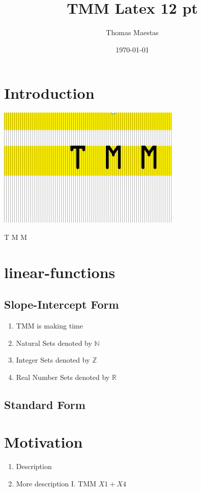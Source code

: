 \documentclass[12pt,letterpaper]{article}
\begin{document}
\date{\today}
\title{TMM Latex 12 pt}
\author{Thomas Maestas}
\maketitle
\section{Introduction} 
\begin{center}
\includegraphics[scale=0.5]{assets/TMM.jpg}
\end{center}
\begin{huge}T M M 
\end{huge}
\section{linear-functions}
\subsection{Slope-Intercept Form}
\begin{enumerate}
\item TMM is making time
\item Natural Sets denoted by $\mathbb{N}$
\item Integer Sets denoted by $\mathbb{Z}$
\item Real Number Sets denoted by $\mathbb{R}$
\end{enumerate}
\subsection{Standard Form}
\section{Motivation}
\begin{enumerate}
\item Description
\item More description
I. TMM $X1 + X4$
\end{enumerate}
\end{document}
